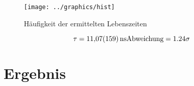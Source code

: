\documentclass[11pt, ngerman, fleqn, DIV=15, headinclude, BCOR=2cm]{scrreprt}
\newcommand{\plotwidth}{0.8\linewidth}
\begin{document}
\begin{figure}
	\centering
	\texttt{[image: ../graphics/hist]}
	\caption{%
		Häufigkeit der ermittelten Lebenszeiten
	}
	\label{fig:langzeit_hist}
\end{figure}

\[
	\tau = \SI{11.07 +- 1.59}{\nano\second}\\
	\text{Abweichung} = 1.24 \sigma
\]


\chapter{Ergebnis}


\end{document}
